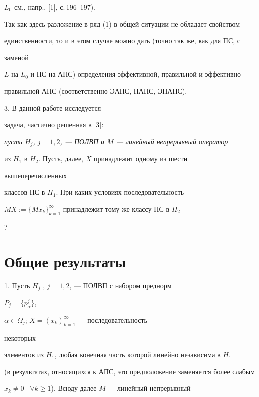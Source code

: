 $L_0$ см., напр., [1], с.\,196--197).





Так как здесь разложение в ряд (1) в общей ситуации не обладает свойством


единственности, то и в этом случае можно дать (точно так же, как для ПС, с


заменой


$L$ на $L_0$ и ПС на АПС) определения эффективной, правильной и эффективно


правильной АПС (соответственно ЭАПС, ПАПС, ЭПАПС).


\medskip





3. В данной работе исследуется 


задача, частично решенная в [3]:





{\it пусть $H_j$, $j=1,2$, --- ПОЛВП и $M$ --- линейный непрерывный оператор


из $H_1$ в $H_2$. Пусть, далее, $X$ принадлежит одному из шести


вышеперечисленных


классов ПС в $H_1$. При каких условиях последовательность


$MX:= \{Mx_k \}_{k=1}^{\infty}$ принадлежит тому же классу ПС в $H_2$}?








\section{Общие результаты}








1. Пусть $H_j$ , $j=1,2$, --- ПОЛВП с набором преднорм


$P_j=\{p_{\alpha}^j\}$,


$\alpha\in\Omega_j$; $X=(x_k)_{k=1}^{\infty}$ --- последовательность


некоторых


элементов из $H_1$, любая конечная часть которой линейно независима в $H_1$


(в результатах, относящихся к АПС, это предположение заменяется более слабым


$x_k\neq 0$ \, $\forall k\ge 1$). Всюду далее $M$ --- линейный непрерывный


